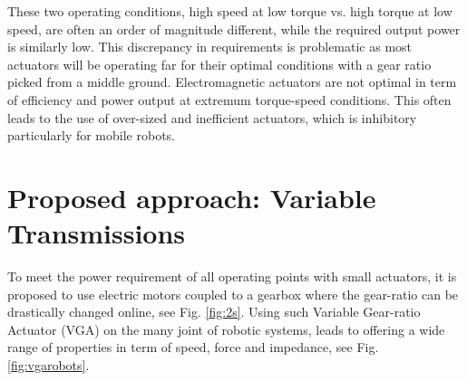These two operating conditions, high speed at low torque vs. high torque at low speed, are often an order of magnitude different, while the required output power is similarly low. This discrepancy in requirements is problematic as most actuators will be operating far for their optimal conditions with a gear ratio picked from a middle ground. Electromagnetic actuators are not optimal in term of efficiency and power output at extremum torque-speed conditions. This often leads to the use of over-sized and inefficient actuators, which is inhibitory particularly for mobile robots.


%




\section{Proposed approach: Variable Transmissions}
\label{sec:ProposedSolutionRobotsUsingMultipleGearRatioActuators}


To meet the power requirement of all operating points with small actuators, it is proposed to use electric motors coupled to a gearbox where the gear-ratio can be drastically changed online, see Fig. \ref{fig:2s}. Using such Variable Gear-ratio Actuator (VGA) on the many joint of robotic systems, leads to offering a wide range of properties in term of speed, force and impedance, see Fig. \ref{fig:vgarobots}.

